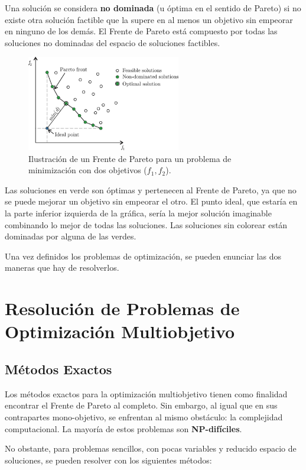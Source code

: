 \documentclass[12pt,a4paper]{book}
\begin{document}
Una solución se considera \textbf{no dominada} (u óptima en el sentido de Pareto) si no existe otra solución factible que la supere en al menos un objetivo sin empeorar en ninguno de los demás. El Frente de Pareto está compuesto por todas las soluciones no dominadas del espacio de soluciones factibles.
\begin{figure}[H]
    \centering
    \includegraphics[width=0.6\textwidth]{images/pareto_front.png}
    \caption{\citep{Bre2017} Ilustración de un Frente de Pareto para un problema de minimización con dos objetivos ($f_1, f_2$).}
    \label{fig:pareto}
\end{figure}
Las soluciones en verde son óptimas y pertenecen al Frente de Pareto, ya que no se puede mejorar un objetivo sin empeorar el otro. El punto ideal, que estaría en la parte inferior izquierda de la gráfica, sería la mejor solución imaginable combinando lo mejor de todas las soluciones. Las soluciones sin colorear están dominadas por alguna de las verdes.

Una vez definidos los problemas de optimización, se pueden enunciar las dos maneras que hay de resolverlos.

\section{Resolución de Problemas de Optimización Multiobjetivo}

\subsection{Métodos Exactos}

Los métodos exactos para la optimización multiobjetivo tienen como finalidad encontrar el Frente de Pareto al completo. Sin embargo, al igual que en sus contrapartes mono-objetivo, se enfrentan al mismo obstáculo: la complejidad computacional. La mayoría de estos problemas son \textbf{NP-difíciles}.

No obstante, para problemas sencillos, con pocas variables y reducido espacio de soluciones, se pueden resolver con los siguientes métodos:
\end{document}
